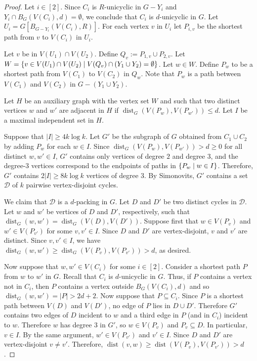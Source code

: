 \documentclass{patmorin}
\DeclareMathOperator{\dist}{dist}
\DeclarePairedDelimiter\set{\{}{\}}
\begin{document}
\begin{proof}
    Let $i\in[2]$. 
    Since $C_i$ is $R$-unicyclic in $G-Y_i$ and $Y_i\cap B_G(V(C_i),d) = \emptyset$, we conclude that $C_i$ is $d$-unicyclic in $G$. 
    Let $U_i = G[B_{G-Y_i}(V(C_i),R)]$. 
    For each vertex $v$ in $U_i$ let $P_{i,v}$ be the shortest path from $v$ to $V(C_i)$ in $U_i$.
    
    Let $v$ be in $V(U_1)\cap V(U_2)$. 
    Define $Q_v:= P_{1,v}\cup P_{2,v}$. 
    Let $W=\set{v \in V(U_1)\cap V(U_2) \mid V(Q_v)\cap (Y_1\cup Y_2) =\emptyset}$.
    Let $w \in W$. 
    Define $P_w$ to be a shortest path from $V(C_1)$ to $V(C_2)$ in $Q_w$. 
    Note that $P_w$ is a path between $V(C_1)$ and $V(C_2)$ in $G-(Y_1\cup Y_2)$. 
    

    Let $H$ be an auxiliary graph with the vertex set $W$ and such that two distinct vertices $w$ and $w'$ are adjacent in $H$ if $\dist_G(V(P_w),V(P_{w'}))\leq d$.
    Let $I$ be a maximal independent set in $H$.

    Suppose that $|I|\geq 4k\log k$.
    Let $G'$ be the subgraph of $G$ obtained from $C_1\cup C_2$ by adding $P_w$ for each $w\in I$. 
    Since $\dist_G(V(P_w),V(P_{w'}))>d\ge0$ for all distinct $w,w'\in I$, $G'$ contains only vertices of degree $2$ and degree $3$, and the degree-$3$ vertices correspond to the endpoints of paths in $\set{P_w\mid w\in I}$.
    Therefore, $G'$ contains $2|I|\geq 8k\log k$ vertices of degree $3$. 
    By Simonovits, $G'$ contains a set $\mathcal{D}$ of $k$ pairwise vertex-disjoint cycles. 
    
    We claim that $\mathcal{D}$ is a $d$-packing in $G$. 
    Let $D$ and $D'$ be two distinct cycles in $\mathcal{D}$. 
    Let $w$ and $w'$ be vertices of $D$ and $D'$, respectively,
    such that $\dist_G(w,w')=\dist_G(V(D),V(D'))$. 
    Suppose first that $w\in V(P_v)$ and $w'\in V(P_{v'})$ for some  $v,v' \in I$. 
    Since $D$ and $D'$ are vertex-disjoint, $v$ and $v'$ are distinct. 
    Since $v,v'\in I$, we have $\dist_G(w,w') \geq \dist_G(V(P_v),V(P_{v'}))>d$, as desired. 

    Now suppose that $w, w' \in V(C_i)$ for some $i\in[2]$. 
    Consider a shortest path $P$ from $w$ to $w'$ in $G$. 
    Recall that $C_i$ is $d$-unicyclic in $G$. 
    Thus, if $P$ contains a vertex not in $C_i$, then $P$ contains a vertex outside $B_G(V(C_i),d)$ and so $\dist_G(w,w')=|P|>2d+2$. 
    Now suppose that $P\subseteq C_i$. 
    Since $P$ is a shortest path between $V(D)$ and $V(D')$, no edge of $P$ lies in $D\cup D'$. 
    Therefore $G'$ contains two edges of $D$ incident to $w$ and a third edge in $P$ (and in $C_i$) incident to $w$. 
    Therefore $w$ has degree $3$ in $G'$, so $w\in V(P_{v})$ and $P_v\subseteq D$. 
    In particular, $v\in I$. 
    By the same argument, $w'\in V(P_{v'})$ and $v'\in I$. 
    Since $D$ and $D'$ are vertex-disjoint $v\neq v'$. 
    Therefore, $\dist(v,w)\ge \dist(V(P_v),V(P_{v'}))>d$. 
    


\end{proof}
\end{document}
